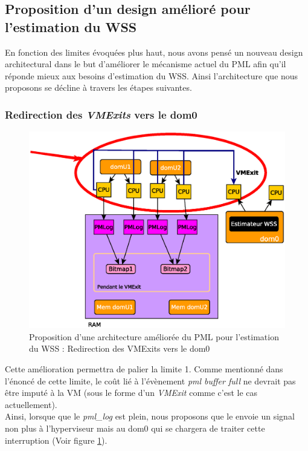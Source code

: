 \subsection{Proposition d'un design amélioré pour l'estimation du WSS} 
En fonction des limites évoquées plus haut, nous avons pensé un nouveau design architectural dans le but d'améliorer le mécanisme actuel du PML afin qu'il réponde mieux aux besoins d'estimation du WSS. Ainsi l'architecture que nous proposons se décline à travers les étapes suivantes.

\subsubsection{Redirection des \textit{VMExits} vers le dom0}
\begin{figure}[htp]
    \centering
    \includegraphics[scale=.8]{chapters/3/fig3/PMLOverview1}
    \caption{Proposition d'une architecture améliorée du PML pour l'estimation du WSS : Redirection des VMExits vers le dom0}
    \label{fig:redirection_vmexit}
\end{figure}
Cette amélioration permettra de palier la limite 1. Comme mentionné dans l'énoncé de cette limite, le coût lié à l'évènement \textit{pml buffer full} ne devrait pas être imputé à la VM (sous le forme d'un \textit{VMExit} comme c'est le cas actuellement).\\
Ainsi, lorsque que le \textit{pml\_log} est plein, nous proposons que le envoie un signal non plus à l'hyperviseur mais au dom0 qui se chargera de traiter cette interruption (Voir figure \ref{fig:redirection_vmexit}).

